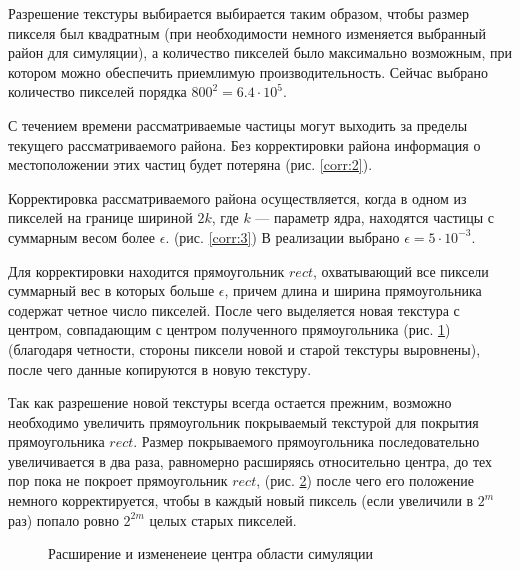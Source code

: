 Разрешение текстуры выбирается выбирается таким образом, чтобы размер пикселя был квадратным
(при необходимости немного изменяется выбранный район для симуляции), а количество пикселей
было максимально возможным, при котором можно обеспечить приемлимую производительность.
Сейчас выбрано количество пикселей порядка $800^2 = 6.4 \cdot 10^5$.

С течением времени рассматриваемые частицы могут выходить за пределы текущего рассматриваемого
района. Без корректировки района информация о местоположении этих частиц будет потеряна
(рис. \ref{corr:2}).

\begin{figure}[ht]
  \centering
\begin{minipage}[t]{.48\textwidth}
  \centering
  \label{corr:3}
\end{minipage}
\begin{minipage}[t]{.48\textwidth}
  \centering
  \label{corr:4}
\end{minipage}
\end{figure}

Корректировка рассматриваемого района осуществляется, когда в одном из пикселей на границе
шириной $2k$, где $k$ --- параметр ядра, находятся частицы с суммарным весом более $\epsilon$.
(рис. \ref{corr:3}) В реализации выбрано $\epsilon = 5 \cdot 10^{-3}$.

Для корректировки находится прямоугольник $rect$, охватывающий все пиксели суммарный вес в которых
больше $\epsilon$, причем длина и ширина прямоугольника содержат четное число пикселей.
После чего выделяется новая текстура с центром, совпадающим с центром полученного прямоугольника
(рис. \ref{corr:4}) (благодаря четности, стороны пиксели новой и старой текстуры выровнены), 
после чего данные копируются в новую текстуру.

Так как разрешение новой текстуры всегда остается прежним, возможно необходимо увеличить
прямоугольник покрываемый текстурой для покрытия прямоугольника $rect$. Размер покрываемого
прямоугольника последовательно увеличивается в два раза, равномерно расширяясь относительно центра,
до тех пор пока не покроет прямоугольник $rect$, (рис. \ref{corr:5}) после чего его положение
немного корректируется, чтобы в каждый новый пиксель (если увеличили в $2^m$ раз) попало ровно
$2^{2m}$ целых старых пикселей.

\begin{figure}[ht]
  \centering
    \caption{Расширение и измененеие центра области симуляции}
    \label{corr:5}
\end{figure}


\FloatBarrier
